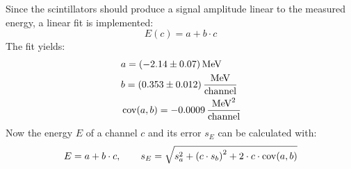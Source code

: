 Since the scintillators should produce a signal amplitude linear to the measured energy, a linear fit is implemented:
\begin{equation}
    E(c) = a + b \cdot c
\end{equation}
The fit yields:
\begin{equation}
    \begin{split}
        & a = (-2.14 \pm 0.07) \, \text{MeV} \\
        & b = (0.353 \pm 0.012) \, \frac{\text{MeV}}{\text{channel}} \\
        & \operatorname{cov}(a, b) = -0.0009 \, \frac{\text{MeV}^2}{\text{channel}} 
    \end{split}
\end{equation}
Now the energy $E$ of a channel $c$ and its error $s_E$ can be calculated with:
\begin{equation}
\label{eq:ecalibration}
    E = a + b \cdot c, \qquad s_E = \sqrt{s_a^2 + \left(c \cdot s_b \right)^2 + 2 \cdot c \cdot \operatorname{cov}(a,b)}
\end{equation}

